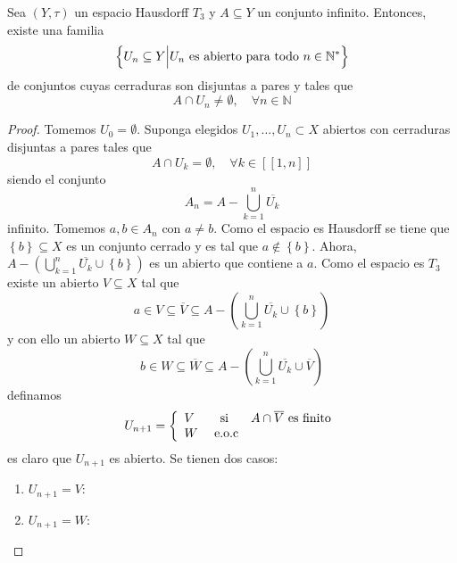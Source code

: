 \documentclass[12pt]{report}
\theoremstyle{largebreak}
\newcommand\natint[1]{\ensuremath{\left[\!\left[#1\right]\!\right] }}
\newcommand{\Cls}[1]{\ensuremath{\overline{#1}}}
\begin{document}
    \begin{excer}
        Sea $(Y,\tau)$ un espacio Hausdorff $T_3$ y $A\subseteq Y$ un conjunto infinito. Entonces, existe una familia
        \begin{equation*}
            \left\{U_n\subseteq Y\Big|U_n\textup{ es abierto para todo }n\in\mathbb{N}^* \right\}
        \end{equation*}
        de conjuntos cuyas cerraduras son disjuntas a pares y tales que
        \begin{equation*}
            A\cap U_n\neq\emptyset,\quad\forall n\in\mathbb{N}
        \end{equation*}
    \end{excer}

    \begin{proof}
        Tomemos $U_0=\emptyset$. Suponga elegidos $U_1,...,U_n\subset X$ abiertos con cerraduras disjuntas a pares tales que
        \begin{equation*}
            A\cap U_k=\emptyset,\quad\forall k\in\natint{1,n}
        \end{equation*}
        siendo el conjunto
        \begin{equation*}
            A_n=A-\bigcup_{ k=1}^n\Cls{U_k}
        \end{equation*}
        infinito. Tomemos $a,b\in A_n$ con $a\neq b$. Como el espacio es Hausdorff se tiene que $\left\{b \right\}\subseteq X$ es un conjunto cerrado y es tal que $a\notin\left\{b \right\}$. Ahora, $A-\left(\bigcup_{ k=1}^n\Cls{U_k}\cup\left\{b\right\} \right)$ es un abierto que contiene a $a$. Como el espacio es $T_3$ existe un abierto $V\subseteq X$ tal que
        \begin{equation*}
            a\in V\subseteq\Cls{V}\subseteq A-\left(\bigcup_{ k=1}^n\Cls{U_k}\cup\left\{b\right\} \right) 
        \end{equation*}
        y con ello un abierto $W\subseteq X$ tal que
        \begin{equation*}
            b\in W\subseteq\Cls{W}\subseteq A-\left(\bigcup_{ k=1}^n\Cls{U_k}\cup\Cls{V}\right)
        \end{equation*}
        definamos
        \begin{equation*}
            U_{ n+1}=\left\{
                \begin{array}{lcr}
                    V & \textup{ si } & A\cap\Cls{V}\textup{ es finito} \\
                    W & \textup{ e.o.c} & \\
                \end{array}
            \right.
        \end{equation*}
        es claro que $U_{ n+1}$ es abierto. Se tienen dos casos:
        \begin{enumerate}
            \item $U_{ n+1}=V$:
            \item $U_{ n+1}=W$: 
        \end{enumerate}
    \end{proof}
\end{document}
